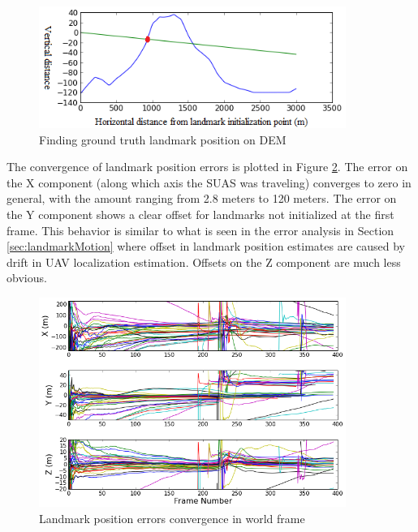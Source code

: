\begin{figure}[h]
\centering
\includegraphics[width=10cm, keepaspectratio=true]
{./Figures/fltfig/find_groundtruth.png}
\caption{Finding ground truth landmark position on DEM}
\label{fltfig:7}
\end{figure}

The convergence of landmark position errors is plotted in Figure
\ref{fltfig:8}. The error on the X component (along which axis the
SUAS was traveling) converges to zero in general, with the amount
ranging from 2.8 meters to 120 meters. The error on the Y component
shows a clear offset for landmarks not initialized at the first frame. This
behavior is similar to what is seen in the error analysis in Section
\ref{sec:landmarkMotion} where offset in landmark position estimates
are caused by drift in UAV localization estimation. Offsets on the Z
component are much less obvious.

\begin{figure}[h]
\centering
\includegraphics[width=10cm, keepaspectratio=true]
{./Figures/fltfig/cut1/Figure50.png}
\caption{Landmark position errors convergence in world frame}
\label{fltfig:8}
\end{figure}

